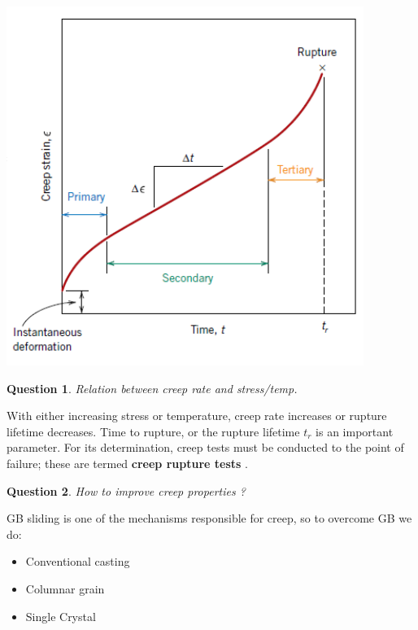 \documentclass[13]{article}
\newtheorem{exer}{Question}
\begin{document}
\begin{center}
\includegraphics[scale=0.5]{figures/39.png}
\end{center}
\begin{exer}
Relation between creep rate and stress/temp. 
\end{exer}
With either increasing stress or temperature, creep rate increases or rupture lifetime decreases. Time to rupture, or the rupture lifetime $t_r$ is an important parameter. For its determination, creep tests must be conducted to the point of failure; these are termed \textbf{creep rupture tests} .
\begin{exer}
How to improve creep properties ?
\end{exer}
GB sliding is one of the mechanisms responsible for creep, so to overcome GB we do:
\begin{itemize}

\item Conventional casting 
\item Columnar grain
\item Single Crystal 

\end{itemize}
\end{document}
